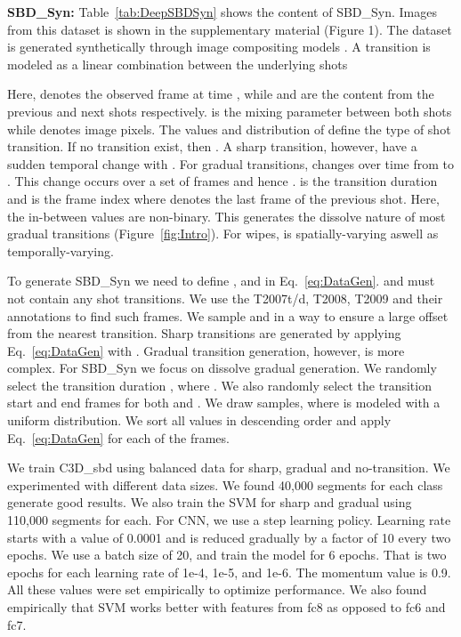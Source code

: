 \documentclass[journal]{IEEEtran}
\begin{document}
\textbf{SBD\_Syn:} 
Table~\ref{tab:DeepSBDSyn} shows the content of SBD\_Syn. Images from this dataset is shown in the supplementary material (Figure 1). 
The dataset is generated synthetically through image compositing models \cite{Levin07}. A transition is modeled as a linear combination between the underlying shots 

Here,  denotes the observed frame at time , while  and  are the content from the previous and next shots respectively.  is the mixing parameter between both shots while  denotes image pixels. The values and distribution of  define the type of shot transition. If no transition exist, then . A sharp transition, however, have a sudden temporal change with . For gradual transitions,  changes over time from  to . This change occurs over a set of frames and hence .  is the transition duration and  is the frame index where  denotes the last frame of the previous shot. Here, the in-between  values are non-binary. This generates the dissolve nature of most gradual transitions (Figure~\ref{fig:Intro}). For wipes,  is spatially-varying aswell as temporally-varying. 

To generate SBD\_Syn we need to define ,  and  in Eq.~\ref{eq:DataGen}.  and  must not contain any shot transitions. We use the T2007t/d, T2008, T2009 and their annotations to find such frames. We sample  and  in a way to ensure a large offset from the nearest transition. Sharp transitions are generated by applying Eq.~\ref{eq:DataGen} with . Gradual transition generation, however, is more complex. For SBD\_Syn we focus on dissolve gradual generation. We randomly select the transition duration , where . We also randomly select the transition start and end frames for both  and . We draw   samples, where  is modeled with a uniform distribution. We sort all  values in descending order and apply Eq.~\ref{eq:DataGen} for each of the  frames. 

We train C3D\_{sbd} using balanced data for sharp, gradual and no-transition. We experimented with different data sizes. We found 40,000 segments for each class generate good results. We also train the SVM for sharp and gradual using 110,000 segments for each. For CNN, we use a step learning policy. Learning rate starts with a value of 0.0001 and is reduced gradually by a factor of 10 every two epochs. We use a batch size of 20, and train the model for 6 epochs. That is two epochs for each learning rate of 1e-4, 1e-5, and 1e-6. The momentum value is 0.9. All these values were set empirically to optimize performance. We also found empirically that SVM works better with features from fc8 as opposed to fc6 and fc7. 
\end{document}
